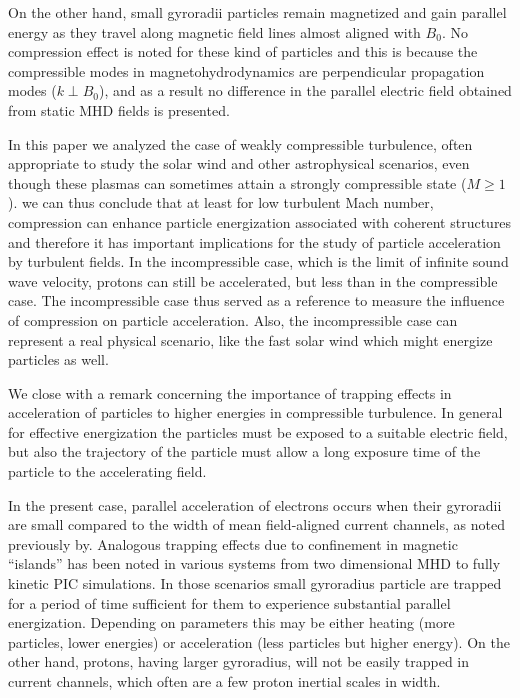 \documentclass[%
aip,pop,amsmath,amssymb,
 reprint,%
]{revtex4-1}
\begin{document}
On the other hand, small gyroradii particles remain
magnetized and gain parallel energy as 
they travel along magnetic field lines almost aligned with $B_0$. No compression effect is
noted for these kind of particles and this is because the compressible modes in 
magnetohydrodynamics are perpendicular propagation modes ($k \perp B_0$), and as a result
no difference in the parallel electric field obtained from static MHD fields is presented.

In this paper we analyzed the case of weakly compressible turbulence, 
often appropriate to study the solar wind and other astrophysical scenarios, even though these plasmas
can sometimes attain a strongly compressible state 
($M \geq 1$). we can thus conclude that at least for low turbulent 
Mach number, compression can enhance particle energization associated 
with coherent structures and therefore it has important implications for the study of
particle acceleration by turbulent fields. In the incompressible case, which is the limit
of infinite sound wave velocity, protons can still be accelerated, but less than
in the compressible case. The incompressible case thus served as a reference to measure the
influence of compression on particle acceleration. Also, the incompressible case can 
represent a real physical scenario, like the fast solar wind which might energize particles as
well\cite{Bogdan2014}.

We close with a remark concerning the importance of trapping effects in acceleration of particles 
to higher energies in compressible turbulence. In general for effective energization the particles must be exposed to 
a suitable electric field, but also the trajectory of the particle must allow  
a long exposure time of the particle to the accelerating field. 

In the present case, parallel acceleration of electrons occurs when their gyroradii
are small compared to the width of mean field-aligned current channels, as noted previously by\cite{PD1}.
Analogous trapping effects due to confinement in magnetic ``islands'' has been noted in various systems from two dimensional  MHD
\cite{AmbrosianoEA88} to fully kinetic PIC simulations\cite{DrakeEA06}. In those scenarios small gyroradius particle are trapped
for a period of time sufficient for them to experience substantial parallel energization. Depending on parameters this may be 
either heating (more particles, lower energies) or acceleration (less particles but higher energy).
On the other hand, protons, having larger gyroradius, will not be easily trapped in current channels, 
which often are a few proton inertial scales in width. 
\end{document}
